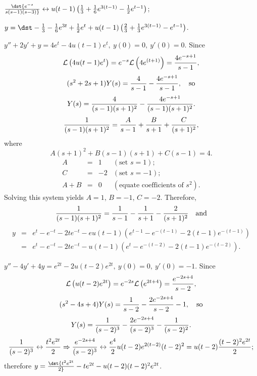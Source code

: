 \documentclass[dvips]{book}
\renewcommand{\exer}[1]{\par\medskip\;\noindent{\color{red}\bf #1.}}
\numberwithin{example}{section}
\numberwithin{equation}{section}
\numberwithin{theorem}{section}
\numberwithin{table}{section}
\numberwithin{figure}{section}
\begin{document}
$\dst{e^{-s}\over s(s-1)(s-3)}
\leftrightarrow u(t-1)\left(
{1\over3}+{1\over6}e^{3(t-1)}-{1\over2}e^{t-1}\right)$;

$y=\dst-{1\over3}-{1\over6}e^{3t}
+{1\over2}e^t+u(t-1)\left({2\over3}+{1\over3}e^{3(t-1)}
-e^{t-1}\right)$.



\exer{8.5.16}
 $y''+2y'+y=4e^t-4u(t-1)e^t,\ y(0)=0,\ y'(0)=0$. Since
$$
{\cal L}\left(4u(t-1)e^t\right)=e^{-s}{\cal
L}\left(4e^{(t+1)}\right)={4e^{-s+1}\over s-1},
$$
$$
(s^2+2s+1)Y(s)={4\over s-1}-{4e^{-s+1}\over s-1},\mbox{\quad so}
$$
$$
Y(s)={4\over(s-1)(s+1)^2}-{4e^{-s+1}\over(s-1)(s+1)^2}.
$$
$$
{1\over(s-1)(s+1)^2}={A\over s-1}+{B\over s+1}+
{C\over(s+1)^2},
$$
where
$$
A(s+1)^2+B(s-1)(s+1)+C(s-1)=4.
$$
$$
\begin{array}{rcll}
A&=&1&(\mbox{set }s=1);\\
C&=&-2&(\mbox{set }s=-1);\\
A+B&=&0&(\mbox{equate coefficients of }s^2).
\end{array}
$$
Solving this system yields $A=1$, $B=-1$, $C=-2$. Therefore,
$$
{1\over(s-1)(s+1)^2}={1\over s-1}-{1\over s+1}-
{2\over(s+1)^2}\mbox{\quad and}
$$
\begin{eqnarray*}
y&=&e^t-e^{-t}-2te^{-t}-eu(t-1)\left(e^{t-1}-e^{-(t-1)}-
2(t-1)e^{-(t-1)}\right)\\
&=&
e^t-e^{-t}-2te^{-t}-u(t-1)\left(e^t-e^{-(t-2)}-2(t-1)e^{-(t-2)}\right).
\end{eqnarray*}


\exer{8.5.18}
 $y''-4y'+4y=e^{2t}-2u(t-2)e^{2t},\ y(0)=0,\ y'(0)=-1$.
Since
$$
{\cal L}\left(u(t-2)e^{2t}\right)=e^{-2s}{\cal
L}\left(e^{2t+4}\right)={e^{-2s+4}\over s-2},
$$
$$
(s^2-4s+4)Y(s)={1\over s-2}-{2e^{-2s+4}\over s-2}-1,\mbox{\quad so}
$$
$$
Y(s)={1\over(s-2)^3}-{2e^{-2s+4}\over(s-2)^3}-{1\over(s-2)^2}.
$$
$$
{1\over(s-2)^3}\leftrightarrow {t^2e^{2t}\over2}\Rightarrow
{e^{-2s+4}\over(s-2)^3}\leftrightarrow{e^4\over2}u(t-2)e^{2(t-2)}(t-2)^2
=u(t-2){(t-2)^2e^{2t}\over2};
$$
therefore
$y=\dst{t^2e^{2t}\over2}-te^{2t}-u(t-2)(t-2)^2e^{2t}$.
\end{document}
